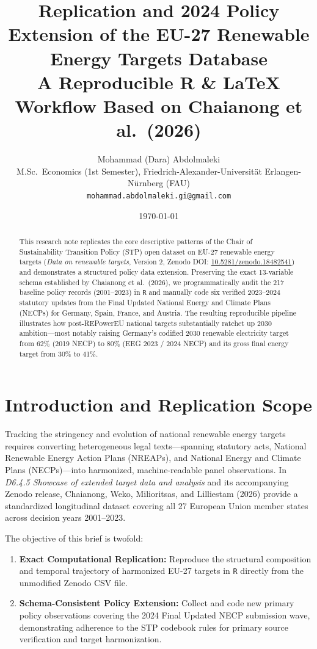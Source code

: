 \documentclass[11pt,a4paper]{article}
\title{\textbf{\color{stpblue}Replication and 2024 Policy Extension of the EU-27 Renewable Energy Targets Database}\\[0.3em]
\large A Reproducible R \& \LaTeX{} Workflow Based on Chaianong et al.\ (2026)}
\author{Mohammad (Dara) Abdolmaleki\\
\small M.Sc.\ Economics (1st Semester), Friedrich-Alexander-Universit\"at Erlangen-N\"urnberg (FAU)\\
\small \texttt{mohammad.abdolmaleki.gi@gmail.com}}
\date{\today}
\begin{document}
\maketitle

\begin{abstract}
\noindent This research note replicates the core descriptive patterns of the Chair of Sustainability Transition Policy (STP) open dataset on EU-27 renewable energy targets (\textit{Data on renewable targets}, Version 2, Zenodo DOI: \href{https://doi.org/10.5281/zenodo.18482541}{10.5281/zenodo.18482541}) and demonstrates a structured policy data extension. Preserving the exact 13-variable schema established by Chaianong et al.\ (2026), we programmatically audit the 217 baseline policy records (2001--2023) in \texttt{R} and manually code six verified 2023--2024 statutory updates from the Final Updated National Energy and Climate Plans (NECPs) for Germany, Spain, France, and Austria. The resulting reproducible pipeline illustrates how post-REPowerEU national targets substantially ratchet up 2030 ambition—most notably raising Germany's codified 2030 renewable electricity target from 62\% (2019 NECP) to 80\% (EEG 2023 / 2024 NECP) and its gross final energy target from 30\% to 41\%.
\end{abstract}

\section{Introduction and Replication Scope}
Tracking the stringency and evolution of national renewable energy targets requires converting heterogeneous legal texts—spanning statutory acts, National Renewable Energy Action Plans (NREAPs), and National Energy and Climate Plans (NECPs)—into harmonized, machine-readable panel observations. In \textit{D6.4.5 Showcase of extended target data and analysis} and its accompanying Zenodo release, Chaianong, Weko, Milioritsas, and Lilliestam (2026) provide a standardized longitudinal dataset covering all 27 European Union member states across decision years 2001--2023.

The objective of this brief is twofold:
\begin{enumerate}
    \item \textbf{Exact Computational Replication:} Reproduce the structural composition and temporal trajectory of harmonized EU-27 targets in \texttt{R} directly from the unmodified Zenodo CSV file.
    \item \textbf{Schema-Consistent Policy Extension:} Collect and code new primary policy observations covering the 2024 Final Updated NECP submission wave, demonstrating adherence to the STP codebook rules for primary source verification and target harmonization.
\end{enumerate}
\end{document}
